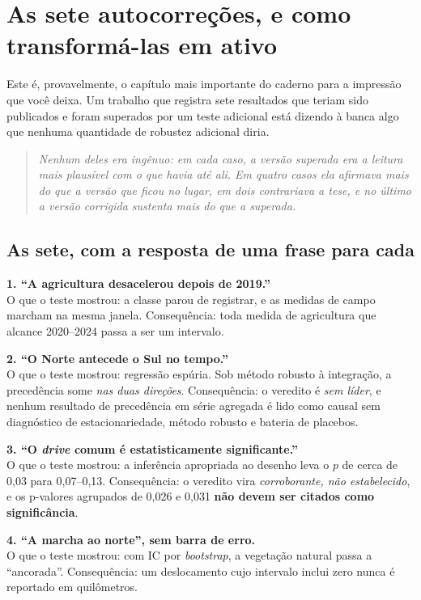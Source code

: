 \chapter{As sete autocorreções, e como transformá-las em ativo}

Este é, provavelmente, o capítulo mais importante do caderno para a impressão
que você deixa. Um trabalho que registra sete resultados que teriam sido
publicados e foram superados por um teste adicional está dizendo à banca algo
que nenhuma quantidade de robustez adicional diria.

\begin{quote}\itshape\color{cortinta}
Nenhum deles era ingênuo: em cada caso, a versão superada era a leitura mais
plausível com o que havia até ali. Em quatro casos ela afirmava \emph{mais} do
que a versão que ficou no lugar, em dois contrariava a tese, e no último a
versão corrigida sustenta \emph{mais} do que a superada.
\end{quote}

\section{As sete, com a resposta de uma frase para cada}

\vspace{4pt}
\textbf{1. ``A agricultura desacelerou depois de 2019.''}  \\
O que o teste mostrou: a classe parou de registrar, e as medidas de campo
marcham na mesma janela. Consequência: toda medida de agricultura que alcance
2020--2024 passa a ser um intervalo.

\textbf{2. ``O Norte antecede o Sul no tempo.''}  \\
O que o teste mostrou: regressão espúria. Sob método robusto à integração, a
precedência some \emph{nas duas direções}. Consequência: o veredito é
\emph{sem líder}, e nenhum resultado de precedência em série agregada é lido
como causal sem diagnóstico de estacionariedade, método robusto e bateria de
placebos.

\textbf{3. ``O \emph{drive} comum é estatisticamente significante.''}  \\
O que o teste mostrou: a inferência apropriada ao desenho leva o $p$ de cerca de
0,03 para 0,07--0,13. Consequência: o veredito vira \emph{corroborante, não
estabelecido}, e os p-valores agrupados de 0,026 e 0,031 \textbf{não devem
ser citados como significância}.

\textbf{4. ``A marcha ao norte'', sem barra de erro.}  \\
O que o teste mostrou: com IC por \emph{bootstrap}, a vegetação natural passa a
``ancorada''. Consequência: um deslocamento cujo intervalo inclui zero nunca é
reportado em quilômetros.

